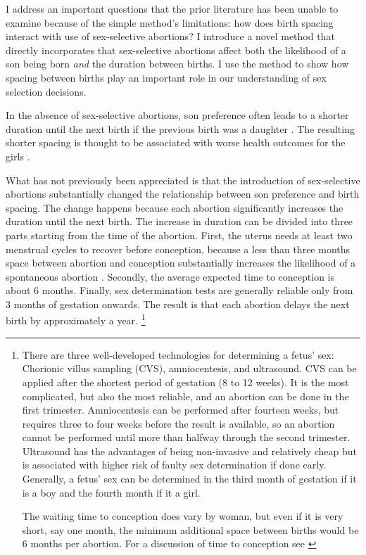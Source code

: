 \documentclass[12pt,letterpaper]{article}
\begin{document}
I address an important questions that the prior literature has been unable
to examine because of the simple method's limitations:
how does birth spacing interact with use of sex-selective abortions?
I introduce a novel method that directly incorporates that sex-selective 
abortions affect both the likelihood of a son being born \emph{and} the duration between 
births.
I use the method to show how spacing between births play an important role in our 
understanding of sex selection decisions.



In the absence of sex-selective abortions, son preference often leads to a shorter duration 
until the next birth if the previous birth was a daughter  
\citep[see, for example,][]{Das1987,Rahman1993,Pong1994,Haughton1996,Arnold1997}.
The resulting shorter spacing is thought to be associated with worse health outcomes for
the girls \citep{arnold98,Whitworth2002,Rutstein2005,Conde-Agudelo2006}.

What has not previously been appreciated is that the introduction of sex-selective 
abortions substantially changed the relationship between son preference and birth spacing.
The change happens because each abortion significantly increases the duration until the
next birth.
The increase in duration can be divided into three parts starting from the time of
the abortion.
First, the uterus needs at least two menstrual cycles to recover 
before conception, because a less than three months space 
between abortion and conception substantially increases the likelihood 
of a spontaneous abortion \citep{zhou00b}.
Secondly, the average expected time to conception is about 6 months.
Finally, sex determination tests are generally reliable only from 3 months of gestation onwards.
The result is that each abortion delays the next birth by approximately a year.%
\footnote{
There are three well-developed technologies for determining a fetus' sex: 
Chorionic villus sampling (CVS), amniocentesis, and ultrasound.
CVS can be applied after the shortest period
of gestation (8 to 12 weeks).
It is the most complicated, but also the most reliable, and an abortion can be done in 
the first trimester.
Amniocentesis can be performed after fourteen weeks, but requires three to four weeks
before the result is available, so an abortion cannot be performed until more than 
halfway through the second trimester.
Ultrasound has the advantages of being non-invasive and relatively cheap but 
is associated with higher risk of faulty sex determination if done early.
Generally, a fetus' sex can be determined in the third month of gestation if it is a
boy and the fourth month if it a girl.

The waiting time to conception does vary by woman, but
even if it is very short, say one  month, the minimum additional space between
births would be 6 months per abortion.
For a discussion of time to conception see \citep{Wang2003}
}
\end{document}
